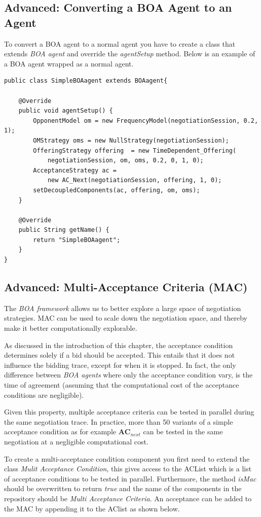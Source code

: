 \documentclass[]{article}
\begin{document}
\subsection{Advanced: Converting a BOA Agent to an Agent}
To convert a BOA agent to a normal agent you have to create a class that extends \textit{BOA agent} and override the \textit{agentSetup} method. Below is an example of a BOA agent wrapped as a normal agent.

\begin{lstlisting}
public class SimpleBOAagent extends BOAagent{

	@Override
	public void agentSetup() {
		OpponentModel om = new FrequencyModel(negotiationSession, 0.2, 1);
		OMStrategy oms = new NullStrategy(negotiationSession);
		OfferingStrategy offering  = new TimeDependent_Offering(
			negotiationSession, om, oms, 0.2, 0, 1, 0);
		AcceptanceStrategy ac = 
			new AC_Next(negotiationSession, offering, 1, 0);
		setDecoupledComponents(ac, offering, om, oms);		
	}

	@Override
	public String getName() {
		return "SimpleBOAagent";
	}
}
\end{lstlisting}

\subsection{Advanced: Multi-Acceptance Criteria (MAC)}
The \textit{BOA framework} allows us to better explore a large space of negotiation strategies. MAC can be used to scale down the negotiation space, and thereby make it better computationally explorable.

As discussed in the introduction of this chapter, the acceptance condition determines solely if a bid should be accepted. This entails that it does not influence the bidding trace, except for when it is stopped. In fact, the only difference between \textit{BOA agents} where only the acceptance condition vary, is the time of agreement (assuming that the computational cost of the acceptance conditions are negligible).

Given this property, multiple acceptance criteria can be tested in parallel during the same negotiation trace. In practice, more than 50 variants of a simple acceptance condition as for example $\textbf{AC}_{next}$ can be tested in the same negotiation at a negligible computational cost.

To create a multi-acceptance condition component you first need to extend the class \textit{Mulit Acceptance Condition}, this gives access to the ACList which is a list of acceptance conditions to be tested in parallel. Furthermore, the method \textit{isMac} should be overwritten to return \textit{true} and the name of the components in the repository should be \textit{Multi Acceptance Criteria}. An acceptance can be added to the MAC by appending it to the AClist as shown below. 
\end{document}

